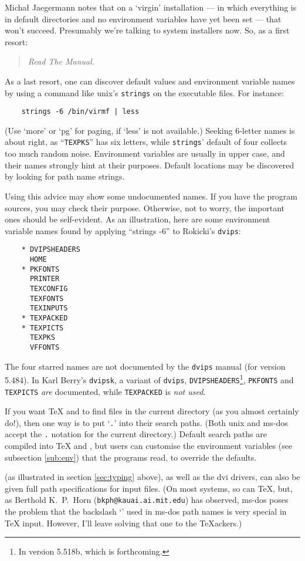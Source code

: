Micha{\l} {\sc Jaegermann} notes that on a `virgin' installation
--- in which everything is in default directories and no environment
variables have yet been set --- that won't succeed.  Presumably we're
talking to system installers now.  So, as a first resort:
\begin{quote}
    \em Read The Manual.
\end{quote}
As a last resort, one can discover default values and environment
variable names by using a command like {\sc unix}'s {\tt strings}
on the executable files.
For instance:
\begin{verbatim}
    strings -6 /bin/virmf | less
\end{verbatim}
(Use `more' or `pg' for paging, if `less' is not available.)
Seeking 6-letter names is about right, as ``{\tt TEXPKS}'' has six
letters, while {\tt strings\/}' default of four collects too much
random noise.
Environment variables are usually in upper case, and their names
strongly hint at their purposes.
Default locations may be discovered by looking for path name strings.

Using this advice may show some undocumented names.
If you have the program sources, you may check their purpose.
Otherwise, not to worry, the important ones should be self-evident.
As an illustration, here are some environment variable names found by
applying ``strings -6'' to {\sc Rokicki's} {\tt dvips}:
\begin{verbatim}
    * DVIPSHEADERS
      HOME
    * PKFONTS
      PRINTER
      TEXCONFIG
      TEXFONTS
      TEXINPUTS
    * TEXPACKED
    * TEXPICTS
      TEXPKS
      VFFONTS
\end{verbatim}
The four starred names are not documented by the {\tt dvips} manual
(for version 5.484).
In Karl {\sc Berry's} {\tt dvipsk}, a variant of {\tt dvips},
{\tt DVIPSHEADERS}\footnote{In version 5.518b, which is forthcoming.},
{\tt PKFONTS} and {\tt TEXPICTS} {\em are\/}
documented, while {\tt TEXPACKED} is {\em not used}.

If you want \TeX{} and \MF{} to find files in the current directory
(as you almost certainly do!), then one way is to put `{\tt .}' into
their search paths.
(Both {\sc unix} and {\sc ms-dos} accept the {\tt .} notation
for the current directory.)
Default search paths are compiled into \TeX{} and \MF{}, but users
can customise the environment variables (see subsection \ref{sub:env})
that the programs read, to override the defaults.

\MF{} (as illustrated in section \ref{sec:typing} above),
as well as the {\sc dvi} drivers,
can also be given full path specifications for input files.
(On most systems, so can \TeX{}, but, as Berthold K.~P.~{\sc Horn}
({\tt bkph@kauai.ai.mit.edu}) has observed,
{\sc ms-dos} poses the problem that the backslash `\ttbsl{}'
used in {\sc ms-dos} path names is very special in \TeX{} input.
However, I'll leave solving that one to the \TeX{}ackers.)


